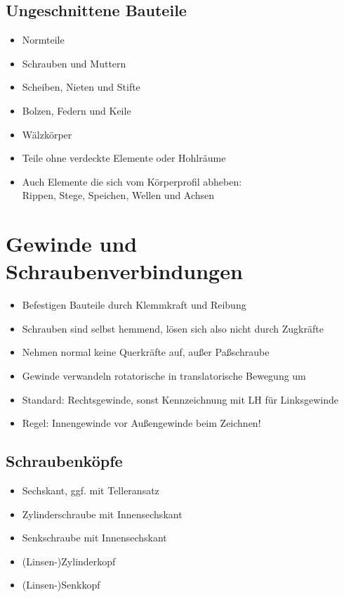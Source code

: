\documentclass[a4paper,parskip=half*,DIV=7,fontsize=11pt]{scrartcl}
\begin{document}
\subsection{Ungeschnittene Bauteile}
\begin{itemize}
	\item Normteile
	\item Schrauben und Muttern
	\item Scheiben, Nieten und Stifte
	\item Bolzen, Federn und Keile
	\item Wälzkörper
	\item Teile ohne verdeckte Elemente oder Hohlräume
	\item Auch Elemente die sich vom Körperprofil abheben:\\
	      Rippen, Stege, Speichen, Wellen und Achsen
\end{itemize}
	
\section{Gewinde und Schraubenverbindungen}
\begin{itemize}
	\item Befestigen Bauteile durch Klemmkraft und Reibung
	\item Schrauben sind selbst hemmend, lösen sich also nicht durch Zugkräfte
	\item Nehmen normal keine Querkräfte auf, außer Paßschraube
	\item Gewinde verwandeln rotatorische in translatorische Bewegung um
	\item Standard: Rechtsgewinde, sonst Kennzeichnung mit LH für Linksgewinde
	\item Regel: Innengewinde vor Außengewinde beim Zeichnen!
\end{itemize}
		
\subsection{Schraubenköpfe}
\begin{itemize}
	\item Sechskant, ggf. mit Telleransatz
	\item Zylinderschraube mit Innensechskant
	\item Senkschraube mit Innensechskant
	\item (Linsen-)Zylinderkopf
	\item (Linsen-)Senkkopf
\end{itemize}
	
\end{document}
